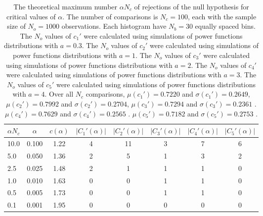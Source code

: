 \begin{table}[h!]
\begin{center}
\begin{tabular}{| l | c | c | c | c | c | c | c |}\hline
$\alpha N_c$ & $\alpha$ & $c(\alpha)$ & $|C_1'(\alpha)|$ & $|C_2'(\alpha)|$ & $|C_3'(\alpha)|$ & $|C_4'(\alpha)|$ & $|C_5'(\alpha)|$ \\\hline
10.0 & 0.100 & 1.22 & 4 & 11 & 3 & 7 & 6 \\\hline
5.0 & 0.050 & 1.36 & 2 & 5 & 1 & 3 & 2 \\\hline
2.5 & 0.025 & 1.48 & 2 & 1 & 1 & 1 & 0 \\\hline
1.0 & 0.010 & 1.63 & 0 & 0 & 1 & 1 & 0 \\\hline
0.5 & 0.005 & 1.73 & 0 & 0 & 1 & 1 & 0 \\\hline
0.1 & 0.001 & 1.95 & 0 & 0 & 0 & 0 & 0 \\\hline
\end{tabular}
\caption{The theoretical maximum number $\alpha N_c$ of rejections
of the null hypothesis for critical values of $\alpha$.
The number of comparisons is $N_c=100$,
each with the sample size of $N_o=1000$ observations.
Each histogram have $N_b=30$ equally spaced bins.
The $N_o$ values of $c_1'$ were calculated using simulations of
 power functions distributions with $a=0.3$.
The $N_o$ values of $c_2'$ were calculated using simulations of
 power functions distributions with $a=1$.
The $N_o$ values of $c_3'$ were calculated using simulations of
 power functions distributions with $a=2$.
The $N_o$ values of $c_4'$ were calculated using simulations of
 power functions distributions with $a=3$.
The $N_o$ values of $c_5'$ were calculated using simulations of
 power functions distributions with $a=4$.
Over all $N_c$ comparisons,
 $\mu(c_1')=0.7220$ and $\sigma(c_1')=0.2649$,
 $\mu(c_2')=0.7992$ and $\sigma(c_2')=0.2704$,
 $\mu(c_3')=0.7294$ and $\sigma(c_3')=0.2361$ .
 $\mu(c_4')=0.7629$ and $\sigma(c_4')=0.2565$ .
 $\mu(c_5')=0.7182$ and $\sigma(c_5')=0.2753$ .
}
\end{center}
\end{table}